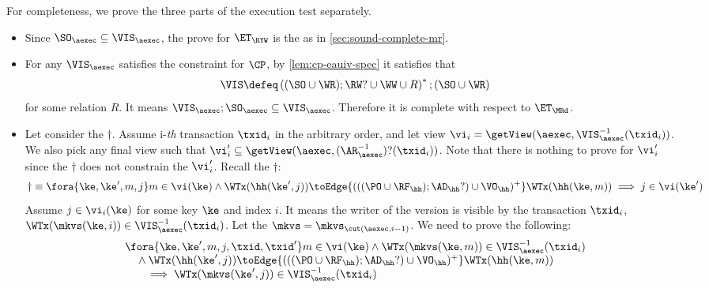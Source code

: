     
For completeness, we prove the three parts of the execution test separately.
\begin{itemize}
\item Since \( \SO_\aexec \subseteq \VIS_\aexec  \), the prove for \( \ET_\RYW \) is the as in \cref{sec:sound-complete-mr}.
\item For any \( \VIS_\aexec \)  satisfies the constraint for \( \CP \), by \cref{lem:cp-eauiv-spec} it satisfies that 
\[
    \VIS \defeq \left( (\SO \cup \WR ) ; \RW? \cup \WW \cup R \right)^* ; (\SO \cup \WR )
\]
for some relation \( R \).
It means \( \VIS_\aexec ; \SO_\aexec \subseteq \VIS_\aexec \).
Therefore it is complete with respect to \( \ET_\MRd \).

\item Let consider the \( \dagger \).
Assume i-\emph{th} transaction \( \txid_i \) in the arbitrary order,
and let view \( \vi_{i} = \getView(\aexec, \VIS^{-1}_{\aexec}(\txid_{i}) ) \).
We also pick any final view such that \( \vi'_{i} \subseteq \getView(\aexec, (\AR^{-1}_{\aexec})?(\txid_{i}) ) \).
Note that there is nothing to prove for \( \vi'_i \) since the \( \dagger \) does not constrain the \( \vi'_i \).
Recall the \( \dagger \):
\[
\dagger  \equiv 
        \fora{\ke, \ke', m, j}
             m \in \vi(\ke)  \wedge \WTx(\hh(\ke', j)) \toEdge{(((\PO \cup \RF_{\hh}) ; \AD_{\hh}?) \cup \VO_{\hh})^{+}} \WTx(\hh(\ke, m))
         \implies j \in \vi(\ke')  
\]
Assume \( j \in \vi_i(\ke) \) for some key \(\ke \) and index \( i \).
It means the writer of the version is visible by the transaction \( \txid_i\),
\ie \( \WTx(\mkvs(\ke,i)) \in \VIS^{-1}_{\aexec}(\txid_{i}) \).
Let the \( \mkvs = \mkvs_{\cut(\aexec, i-1)} \).
We need to prove the following:
\begin{gather}
    \label{equ:cp-complete-arvis}
    \begin{array}{@{}l@{}}
        \fora{\ke, \ke', m, j, \txid, \txid'} 
        m \in \vi(\ke) 
        \land \WTx(\mkvs(\ke,m)) \in \VIS_\aexec^{-1}(\txid_i) \\
        \quad {} \land \WTx(\hh(\ke', j)) \toEdge{(((\PO \cup \RF_{\hh}) ; \AD_{\hh}?) \cup \VO_{\hh})^{+}} \WTx(\hh(\ke, m)) \\
            \qquad \implies \WTx(\mkvs(\ke',j)) \in \VIS_\aexec^{-1}(\txid_i)
    \end{array}
\end{gather}

\end{itemize}
